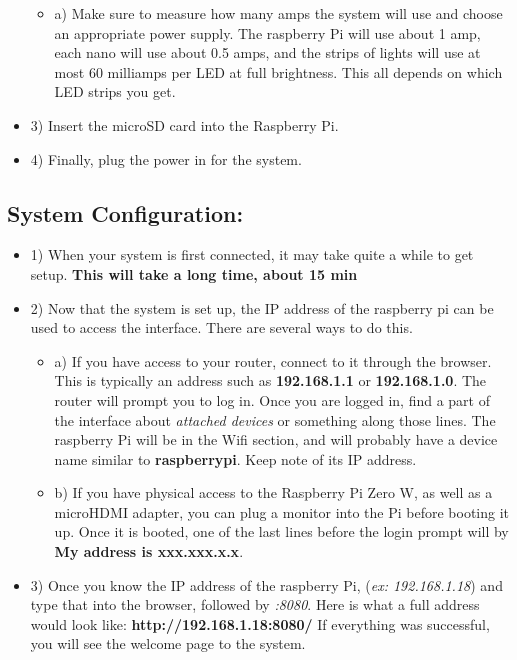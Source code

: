 \documentclass[onecolumn, draftclsnofoot,10pt, compsoc]{IEEEtran}
\begin{document}
\begin{itemize}
		\begin{itemize}
			\item a) Make sure to measure how many amps the system will use and choose an appropriate power supply. The raspberry Pi will use about 1 amp, each nano will use about 0.5 amps, and the strips of lights will use at most 60 milliamps per LED at full brightness. This all depends on which LED strips you get.
		\end{itemize}

		\item 3) Insert the microSD card into the Raspberry Pi.
		\item 4) Finally, plug the power in for the system.
	\end{itemize}


	\subsection{\textbf{System Configuration:}}
	\begin{itemize}
		\item 1) When your system is first connected, it may take quite a while to get setup. \textbf{This will take a long time, about 15 min}
		\item 2) Now that the system is set up, the IP address of the raspberry pi can be used to access the interface. There are several ways to do this.
		\begin{itemize}
			\item a) If you have access to your router, connect to it through the browser. This is typically an address such as \textbf{192.168.1.1} or \textbf{192.168.1.0}. The router will prompt you to log in. Once you are logged in, find a part of the interface about \textit{attached devices} or something along those lines. The raspberry Pi will be in the Wifi section, and will probably have a device name similar to \textbf{raspberrypi}. Keep note of its IP address.
			\item b) If you have physical access to the Raspberry Pi Zero W, as well as a microHDMI adapter, you can plug a monitor into the Pi before booting it up. Once it is booted, one of the last lines before the login prompt will by \textbf{My address is xxx.xxx.x.x}.
		\end{itemize}
		\item 3) Once you know the IP address of the raspberry Pi, (\textit{ex: 192.168.1.18}) and type that into the browser, followed by \textit{:8080}. Here is what a full address would look like: \textbf{http://192.168.1.18:8080/} If everything was successful, you will see the welcome page to the system.
	\end{itemize}
	
\end{document}
